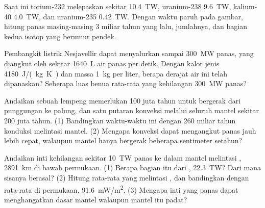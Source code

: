 \begin{exercise}[$\star\star\star$]\label{exo:g12:internal-heat:12}
Saat ini torium-232 melepaskan sekitar \qty{10.4}{TW}, uranium-238
\qty{9.6}{TW}, kalium-40 \qty{4.0}{TW}, dan uranium-235 \qty{0.42}{TW}.
Dengan waktu paruh pada gambar, hitung panas
masing-masing 3 miliar tahun yang lalu, jumlahnya, dan bagian kedua isotop
yang berumur pendek.
\end{exercise}

\begin{exercise}[$\star\star\star$]\label{exo:g12:internal-heat:13}
Pembangkit listrik Nesjavellir dapat menyalurkan sampai \qty{300}{MW} panas,
yang diangkut oleh sekitar \qty{1640}{L} air panas per detik. Dengan kalor
jenis \qty{4180}{J/(kg.K)} dan massa \qty{1}{kg} per liter, berapa derajat air
ini telah dipanaskan? Seberapa luas benua rata-rata yang kehilangan
\qty{300}{MW} panas?
\end{exercise}

\begin{exercise}[$\star\star\star$]\label{exo:g12:internal-heat:14}
Andaikan sebuah lempeng memerlukan 100 juta tahun untuk bergerak dari
punggungan ke palung, dan satu putaran konveksi melalui seluruh mantel sekitar
200 juta tahun. (1)
Bandingkan waktu-waktu ini dengan 260 miliar tahun konduksi melintasi mantel.
(2) Mengapa konveksi dapat mengangkut panas jauh lebih cepat, walaupun mantel
hanya bergerak beberapa sentimeter setahun?
\end{exercise}

\begin{exercise}[$\star\star\star$]\label{exo:g12:internal-heat:15}
Andaikan inti kehilangan sekitar \qty{10}{TW} panas ke dalam mantel melintasi
, \qty{2891}{km} di bawah permukaan. (1) Berapa bagian itu
dari , \qty{22.3}{TW}? Dari mana sisanya
berasal? (2) Hitung  rata-rata yang melintasi
, dan bandingkan dengan  rata-rata di permukaan,
\qty{91.6}{mW/m^2}. (3) Mengapa inti yang panas dapat menghangatkan dasar
mantel walaupun mantel itu padat?
\end{exercise}

